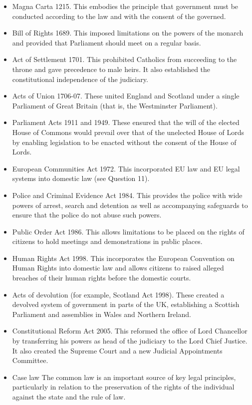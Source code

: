 \documentclass[14pt,titlepage]{extarticle}
\begin{document}
\begin{itemize}
  
\item Magna Carta 1215. This embodies the principle that government must be conducted according to the law and with the consent of the governed.

\item Bill of Rights 1689. This imposed limitations on the powers of the monarch and provided that Parliament should meet on a regular basis.

\item Act of Settlement 1701. This prohibited Catholics from succeeding to the throne and gave precedence to male heirs. It also established the constitutional independence of the judiciary.

\item Acts of Union 1706-07. These united England and Scotland under a single Parliament of Great Britain (that is, the Westminster Parliament).

\item Parliament Acts 1911 and 1949. These ensured that the will of the elected House of Commons would prevail over that of the unelected House of Lords by enabling legislation to be enacted without the consent of the House of Lords.

\item European Communities Act 1972. This incorporated EU law and EU legal systems into domestic law (see Question 11).

\item Police and Criminal Evidence Act 1984. This provides the police with wide powers of arrest, search and detention as well as accompanying safeguards to ensure that the police do not abuse such powers.

\item Public Order Act 1986. This allows limitations to be placed on the rights of citizens to hold meetings and demonstrations in public places.

\item Human Rights Act 1998. This incorporates the European Convention on Human Rights into domestic law and allows citizens to raised alleged breaches of their human rights before the domestic courts.

\item Acts of devolution (for example, Scotland Act 1998). These created a devolved system of government in parts of the UK, establishing a Scottish Parliament and assemblies in Wales and Northern Ireland.

\item Constitutional Reform Act 2005. This reformed the office of Lord Chancellor by transferring his powers as head of the judiciary to the Lord Chief Justice. It also created the Supreme Court and a new Judicial Appointments Committee.

\item Case law
The common law is an important source of key legal principles, particularly in relation to the preservation of the rights of the individual against the state and the rule of law.
\end{itemize}
\end{document}
